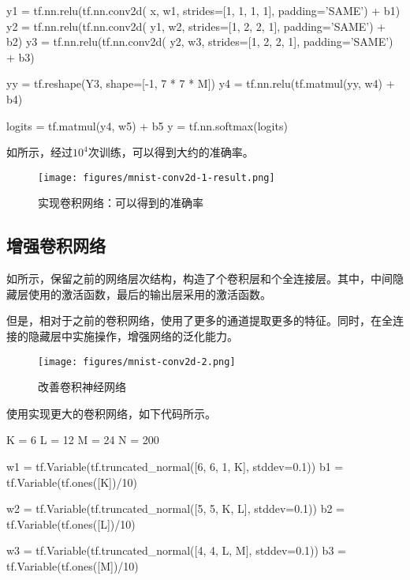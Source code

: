 \begin{content}
\begin{leftbar}
\begin{python}
y1 = tf.nn.relu(tf.nn.conv2d(
       x,  w1, strides=[1, 1, 1, 1], padding='SAME') + b1)
y2 = tf.nn.relu(tf.nn.conv2d(
       y1, w2, strides=[1, 2, 2, 1], padding='SAME') + b2)
y3 = tf.nn.relu(tf.nn.conv2d(
       y2, w3, strides=[1, 2, 2, 1], padding='SAME') + b3)

yy = tf.reshape(Y3, shape=[-1, 7 * 7 * M])
y4 = tf.nn.relu(tf.matmul(yy, w4) + b4)

logits = tf.matmul(y4, w5) + b5
y = tf.nn.softmax(logits)
\end{python}
\end{leftbar}

如所示，经过$10^4$次训练，可以得到大约的准确率。

\begin{figure}[H]
\centering
\texttt{[image: figures/mnist-conv2d-1-result.png]}
\caption{实现卷积网络：可以得到的准确率}
 \label{fig:mnist-conv2d-1-result}
\end{figure}

\subsection{增强卷积网络}

如所示，保留之前的网络层次结构，构造了个卷积层和个全连接层。其中，中间隐藏层使用的激活函数，最后的输出层采用的激活函数。

但是，相对于之前的卷积网络，使用了更多的通道提取更多的特征。同时，在全连接的隐藏层中实施操作，增强网络的泛化能力。

\begin{figure}[H]
\centering
\texttt{[image: figures/mnist-conv2d-2.png]}
\caption{改善卷积神经网络}
 \label{fig:mnist-conv2d-2}
\end{figure}

使用\tf{}实现更大的卷积网络，如下代码所示。

\begin{leftbar}
\begin{python}
K = 6
L = 12
M = 24
N = 200

w1 = tf.Variable(tf.truncated_normal([6, 6, 1, K], stddev=0.1))
b1 = tf.Variable(tf.ones([K])/10)

w2 = tf.Variable(tf.truncated_normal([5, 5, K, L], stddev=0.1))
b2 = tf.Variable(tf.ones([L])/10)

w3 = tf.Variable(tf.truncated_normal([4, 4, L, M], stddev=0.1))
b3 = tf.Variable(tf.ones([M])/10)


\end{python}
\end{leftbar}
\end{content}
